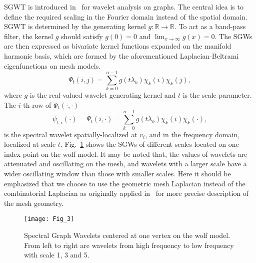 SGWT is introduced in~\cite{Hammond2011} for wavelet analysis
on graphs. The central idea is to define the required scaling in the
Fourier domain instead of the spatial domain. SGWT is determined by
the generating kernel $g \colon \mathbb{R} \rightarrow \mathbb{R}$. To
act as a band-pass filter, the kernel $g$ should satisfy $g(0) = 0$
and $\lim_{x \rightarrow \infty} g(x) = 0$. The SGWs are then
expressed as bivariate kernel functions
expanded on the manifold harmonic basis, which are formed by the
aforementioned Laplacian-Beltrami eigenfunctions on mesh models.
\begin{equation}
\label{eq:SGW}
\Psi_{t}(i,j)=\sum_{k=0}^{n-1}g(t\lambda_k) \chi_k(i)\chi_k(j),
\end{equation}
where $g$ is the real-valued wavelet generating kernel and $t$ is the
scale parameter. The $i$-th row of $\Psi_{t}(\cdot,\cdot)$
\begin{equation}
\label{eq:SGW_vert}
\psi_{t,i}(\cdot) = \Psi_{t}(i,\cdot)=\sum_{k=0}^{n-1}g(t\lambda_k) \chi_k(i)\chi_k(\cdot),
\end{equation}
is the spectral wavelet spatially-localized at $v_i$, and in the
frequency domain, localized at scale $t$. Fig.~\ref{SGW} shows the
SGWs of different scales located on one index point on the wolf model.
It may be noted that, the values of wavelets are attenuated and
oscillating on the mesh, and wavelets with a larger scale have a wider
oscillating window than those with smaller scales. Here it should be emphasized
that we choose to use the geometric mesh Laplacian instead of the combinatorial
Laplacian as originally applied in~\cite{Hammond2011} for more precise description
of the mesh geometry.

\begin{figure}[!to]
\begin{center}
\texttt{[image: Fig\_3]}
\end{center}
\caption[Spectral graph wavelets on the wolf model.]
  {Spectral Graph Wavelets centered at one vertex on the wolf
  model. From left to right are wavelets from high frequency to low
  frequency with scale 1, 3 and 5.}
\label{SGW}
\end{figure}

